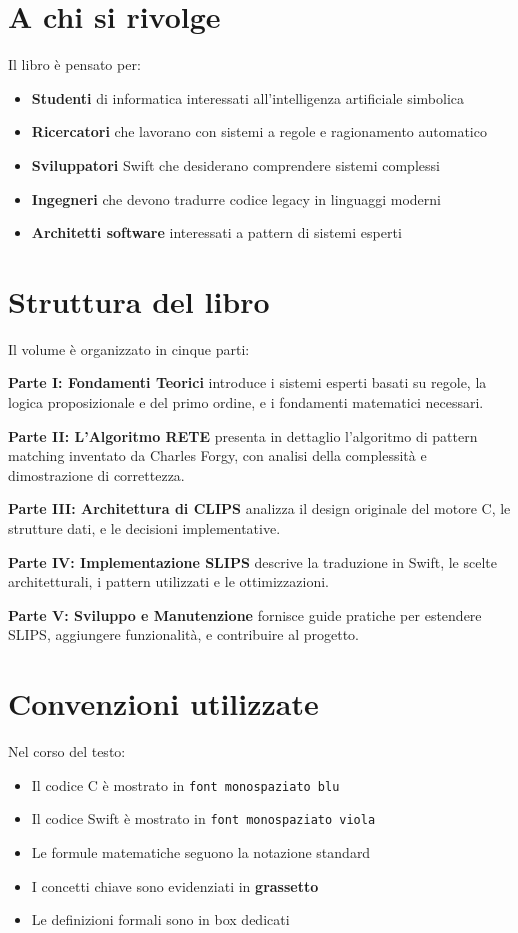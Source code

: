 \documentclass[12pt,a4paper,twoside,openright]{book}
\theoremstyle{definition}
\theoremstyle{remark}
\begin{document}
\section*{A chi si rivolge}

Il libro è pensato per:

\begin{itemize}
\item \textbf{Studenti} di informatica interessati all'intelligenza artificiale simbolica
\item \textbf{Ricercatori} che lavorano con sistemi a regole e ragionamento automatico
\item \textbf{Sviluppatori} Swift che desiderano comprendere sistemi complessi
\item \textbf{Ingegneri} che devono tradurre codice legacy in linguaggi moderni
\item \textbf{Architetti software} interessati a pattern di sistemi esperti
\end{itemize}

\section*{Struttura del libro}

Il volume è organizzato in cinque parti:

\textbf{Parte I: Fondamenti Teorici} introduce i sistemi esperti basati su regole, la logica proposizionale e del primo ordine, e i fondamenti matematici necessari.

\textbf{Parte II: L'Algoritmo RETE} presenta in dettaglio l'algoritmo di pattern matching inventato da Charles Forgy, con analisi della complessità e dimostrazione di correttezza.

\textbf{Parte III: Architettura di CLIPS} analizza il design originale del motore C, le strutture dati, e le decisioni implementative.

\textbf{Parte IV: Implementazione SLIPS} descrive la traduzione in Swift, le scelte architetturali, i pattern utilizzati e le ottimizzazioni.

\textbf{Parte V: Sviluppo e Manutenzione} fornisce guide pratiche per estendere SLIPS, aggiungere funzionalità, e contribuire al progetto.

\section*{Convenzioni utilizzate}

Nel corso del testo:
\begin{itemize}
\item Il codice C è mostrato in \texttt{font monospaziato blu}
\item Il codice Swift è mostrato in \texttt{font monospaziato viola}
\item Le formule matematiche seguono la notazione standard
\item I concetti chiave sono evidenziati in \textbf{grassetto}
\item Le definizioni formali sono in box dedicati
\end{itemize}
\end{document}
